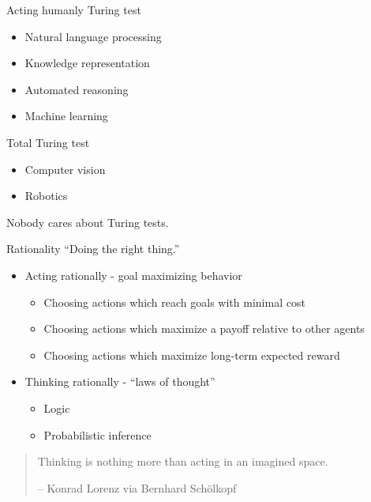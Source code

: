 \documentclass[
  10pt,
  ignorenonframetext,
  aspectratio=1610,
]{ltx-talk}
\providecommand{\tightlist}{%
  \setlength{\itemsep}{0pt}\setlength{\parskip}{0pt}}
\begin{document}
\begin{frame}{Acting humanly}
\protect{}\label{acting-humanly}
Turing test

\begin{itemize}
\tightlist
\item
  Natural language processing
\item
  Knowledge representation
\item
  Automated reasoning
\item
  Machine learning
\end{itemize}

Total Turing test

\begin{itemize}
\tightlist
\item
  Computer vision
\item
  Robotics
\end{itemize}

Nobody cares about Turing tests.
\end{frame}

\begin{frame}{Rationality}
\protect{}\label{rationality}
``Doing the right thing.''

\begin{itemize}
\item
  Acting rationally - goal maximizing behavior

  \begin{itemize}
  \tightlist
  \item
    Choosing actions which reach goals with minimal cost
  \item
    Choosing actions which maximize a payoff relative to other agents
  \item
    Choosing actions which maximize long-term expected reward
  \end{itemize}
\item
  Thinking rationally - ``laws of thought''

  \begin{itemize}
  \tightlist
  \item
    Logic
  \item
    Probabilistic inference
  \end{itemize}
\end{itemize}

\begin{quote}
Thinking is nothing more than acting in an imagined space.

-- Konrad Lorenz via Bernhard Schölkopf
\end{quote}
\end{frame}
\end{document}
